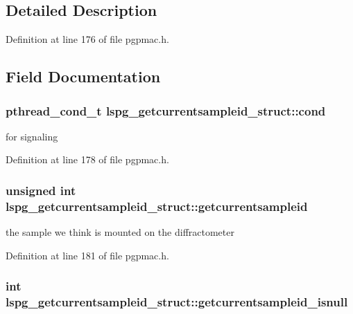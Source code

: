 \subsection{Detailed Description}


Definition at line 176 of file pgpmac.\-h.



\subsection{Field Documentation}
\hypertarget{structlspg__getcurrentsampleid__struct_a289960e45fdc9339a05dc8607f1b7563}{
\subsubsection[{cond}]{\setlength{\rightskip}{0pt plus 5cm}pthread\-\_\-cond\-\_\-t lspg\-\_\-getcurrentsampleid\-\_\-struct\-::cond}}\label{structlspg__getcurrentsampleid__struct_a289960e45fdc9339a05dc8607f1b7563}


for signaling 



Definition at line 178 of file pgpmac.\-h.

\hypertarget{structlspg__getcurrentsampleid__struct_af629de1e076fd6763bccea3547ef24e7}{
\subsubsection[{getcurrentsampleid}]{\setlength{\rightskip}{0pt plus 5cm}unsigned int lspg\-\_\-getcurrentsampleid\-\_\-struct\-::getcurrentsampleid}}\label{structlspg__getcurrentsampleid__struct_af629de1e076fd6763bccea3547ef24e7}


the sample we think is mounted on the diffractometer 



Definition at line 181 of file pgpmac.\-h.

\hypertarget{structlspg__getcurrentsampleid__struct_af370f8d1aaec7dd15121dc65d2a6cfc1}{
\subsubsection[{getcurrentsampleid\-\_\-isnull}]{\setlength{\rightskip}{0pt plus 5cm}int lspg\-\_\-getcurrentsampleid\-\_\-struct\-::getcurrentsampleid\-\_\-isnull}}\label{structlspg__getcurrentsampleid__struct_af370f8d1aaec7dd15121dc65d2a6cfc1}


